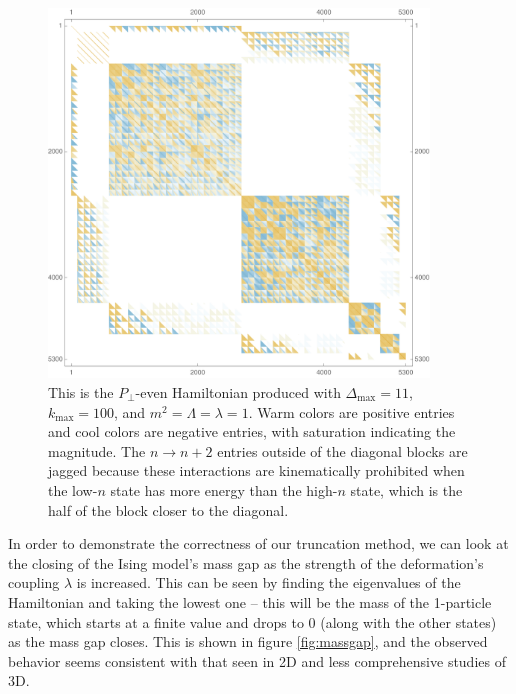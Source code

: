 \begin{figure}
\centering
\includegraphics[width=0.9\textwidth]{truncation_chapter/hamiltonian}	
\caption[Visualization of truncated Hamiltonian]{This is the $P_\perp$-even 
    Hamiltonian produced with $\Delta_\mathrm{max} = 11$, 
    $k_\mathrm{max} = 100$, and $m^2 = \Lambda = \lambda = 1$. Warm colors are
    positive entries and cool colors are negative entries, with saturation 
    indicating the magnitude. The $n \to n+2$ entries outside of the diagonal
    blocks are jagged because these interactions are kinematically prohibited 
    when the low-$n$ state has more energy than the high-$n$ state, which is the
    half of the block closer to the diagonal.}
\label{fig:hamiltonian}
\end{figure}

In order to demonstrate the correctness of our truncation method, we can look at
the closing of the Ising model's mass gap as the strength of the deformation's 
coupling $\lambda$ is increased. This can be seen by finding the eigenvalues of 
the Hamiltonian and taking the lowest one -- this will be the mass of the 
1-particle state, which starts at a finite value and drops to 0 (along with the 
other states) as the mass gap closes. This is shown in figure \ref{fig:massgap}, 
and the observed behavior seems consistent with that seen in 2D and less 
comprehensive studies of 3D.

